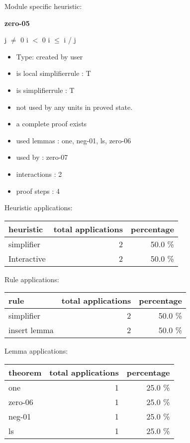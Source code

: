 \documentclass[a4paper]{article}
\begin{document}
Module specific heuristic:

\pagebreak

{\LARGE\bf zero-05}\label{lemma-zero-05}

\medskip

j $\neq$ 0 \Fol i $<$ 0 \Imp i $\le$ i / j

\begin{itemize}

\item Type: created by user

\item is local simplifierrule : T
\item is simplifierrule : T
\item not used by any units in proved state.
\item       a complete proof exists
\item       used lemmas  : one, neg-01, ls, zero-06
\item       used by      : zero-07
\item       interactions : 2
\item       proof steps  : 4
\end{itemize}

\medskip


Heuristic applications:

\begin{supertabular}{l|r|r}
heuristic	& total applications & percentage \\ \hline
simplifier & 2 & 50.0 \% \\
Interactive & 2 & 50.0 \% \\

\end{supertabular}

Rule applications:

\begin{supertabular}{l|r|r}
rule	        & total applications & percentage \\ \hline
simplifier & 2 & 50.0 \% \\
insert lemma & 2 & 50.0 \% \\

\end{supertabular}

Lemma applications:

\begin{supertabular}{l|r|r}
theorem	        & total applications & percentage \\ \hline
one & 1 & 25.0 \% \\
zero-06 & 1 & 25.0 \% \\
neg-01 & 1 & 25.0 \% \\
ls & 1 & 25.0 \% \\

\end{supertabular}
\end{document}
